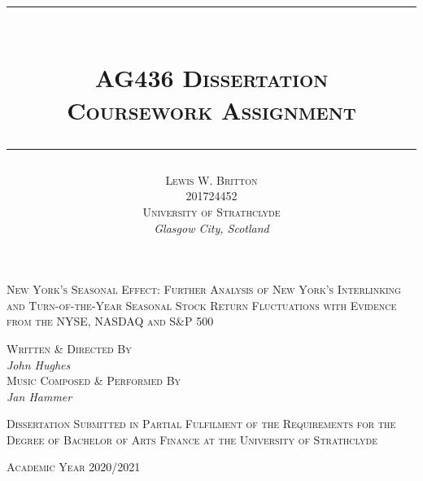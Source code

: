 \documentclass[11pt, english]{article}
\newcommand{\HRule}[1]{\rule{\linewidth}{#1}}
\begin{document}


	\title{
                \HRule{0.5pt}\\ [0.3cm]
                \huge\textsc{AG436 Dissertation}\\
                \Large\textsc{Coursework Assignment}\\ [0.25cm]
                \HRule{0.5pt}
                }
	\author{\textsc{Lewis W. Britton}\\
                \textsc{201724452}\\
                \textsc{University of Strathclyde}\\
		\textit{Glasgow City, Scotland}
                }
	\date{}
	\maketitle

        \begin{center}
                \textsc{New York's Seasonal Effect: Further Analysis of New York's Interlinking and Turn-of-the-Year Seasonal Stock Return Fluctuations with Evidence from the NYSE, NASDAQ and S\&P 500}
        \end{center}

        \vspace{\fill}

	\begin{center}
		\textsc{Written \& Directed By}\\ \textit{John Hughes}\\
		\textsc{Music Composed \& Performed By}\\ \textit{Jan Hammer}
	\end{center}

	\begin{center}
	\end{center}

	\begin{center}
        	\textsc{Dissertation Submitted in Partial Fulfilment of the Requirements for the Degree of Bachelor of Arts Finance at the University of Strathclyde}
	\end{center}

	\begin{center}
		\textsc{Academic Year 2020/2021}
	\end{center}

\newpage

\end{document}
